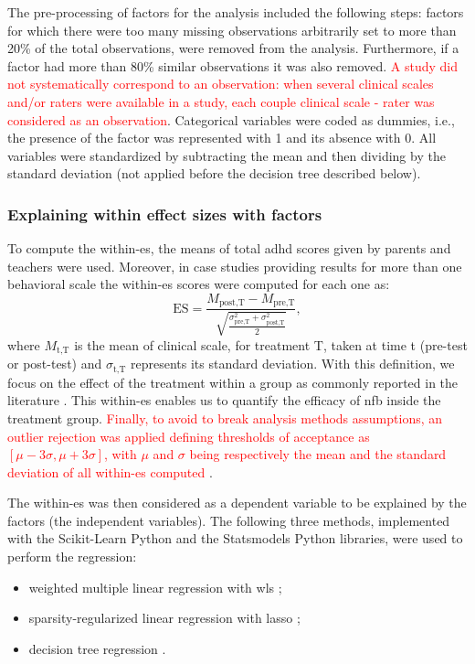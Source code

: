 The pre-processing of factors for the analysis included the following steps: factors for which there were too many 
missing observations arbitrarily set to more than 20\% of the total observations, were removed from the analysis. 
Furthermore, if a factor had more than 80\% similar observations it was also removed. 
\textcolor{red}{A study did not systematically correspond to an observation: when several clinical scales and/or raters were available in a study,
each couple clinical scale - rater was considered as an observation}.
Categorical variables were coded as dummies, i.e., the presence of the factor was represented with 1 and its absence with 0. All variables 
were standardized by subtracting the mean and then dividing by the standard deviation (not applied before the decision tree described below).

\subsubsection{Explaining within effect sizes with factors}

To compute the within-\gls{es}, the  means of total \gls{adhd} scores given by parents and teachers were used. Moreover, 
in case studies providing results for more than one behavioral scale the within-\gls{es} scores were computed for each one as:
\begin{equation*}
\label{eq:factors_effect_size_within_subject}
\text{ES} = \frac{M_{\text{post,T}} - M_{\text{pre,T}}}{\sqrt{\frac{\sigma_{\text{pre,T}}^2 + \sigma_{\text{post,T}}^2}{2}}},
\end{equation*} 
\noindent where $M_{\text{t,T}}$ is the mean of clinical scale, for treatment T, taken at time t (pre-test or post-test) and $\sigma_{\text{t,T}}$ represents 
its standard deviation. With this definition, we focus on the effect of the treatment within a group \citep{Cohen1988} as commonly reported 
in the literature \citep{Arns2009, Maurizio2014, Strehl2017}. This within-\gls{es} enables us to quantify 
the efficacy of \gls{nfb} inside the treatment group. 
\textcolor{red}{Finally, to avoid to break analysis methods assumptions, an outlier rejection was applied defining thresholds of acceptance as 
$[\mu - 3 \sigma, \mu + 3 \sigma]$, with $\mu$ and $\sigma$ being respectively the mean and the standard deviation of all within-\gls{es} computed }\citep{Shewhart1931}.

The within-\gls{es} was then considered as a dependent variable to be explained by the factors (the independent variables). 
The following three methods, implemented with the Scikit-Learn Python \citep[version 0.18.1]{Pedregosa2011} and the Statsmodels Python
\citep[version 0.8.0]{Seabold2010} libraries, were used to perform the regression:
\begin{itemize}
  \item weighted multiple linear regression with \gls{wls} \citep{Montgomery2012};
	\item sparsity-regularized linear regression with \gls{lasso} \citep{Tibshirani1996};
	\item decision tree regression \citep{Quinlan1986}.
\end{itemize}

